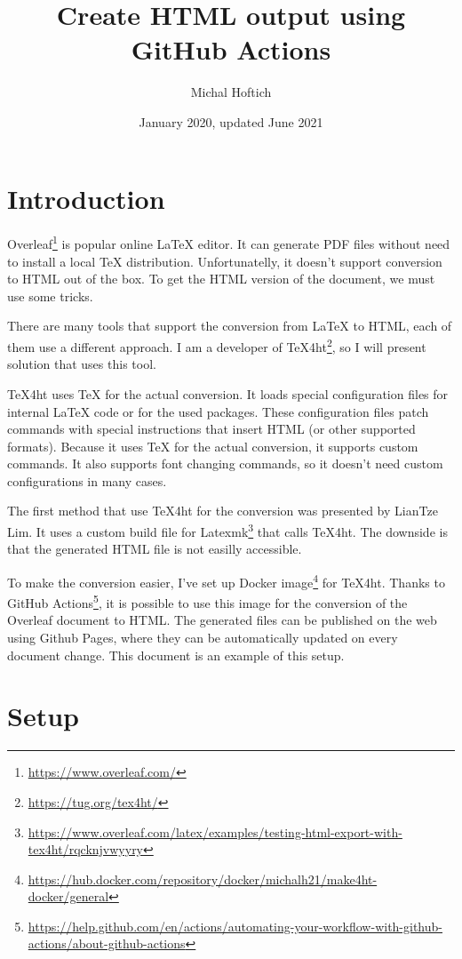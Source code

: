 \documentclass{article}
\title{Create HTML output using GitHub Actions}
\author{Michal Hoftich}
\date{January 2020, updated June 2021}
\newcommand\footurl[1]{\footnote{\url{#1}}}
\newcommand\urllink[2]{#1\footurl{#2}}
\begin{document}
\maketitle


\section{Introduction}

\urllink{Overleaf}{https://www.overleaf.com/} is popular online \LaTeX{}
editor. It can generate PDF files 
without need to install a local \TeX{} distribution. Unfortunatelly, it doesn't
support conversion to HTML out of the box. To get the HTML version of the
document, we must use some tricks.

There are many tools that support the conversion from \LaTeX{} to HTML, each of
them use a different approach. I am a developer of
\urllink{\TeX4ht}{https://tug.org/tex4ht/}, so I will present solution that
uses this tool. 

\TeX4ht uses \TeX{} for the actual conversion. It loads special configuration
files for internal \LaTeX{} code or for the used packages. These configuration
files patch commands with special instructions that insert HTML (or other
supported formats). Because it uses \TeX{} for the actual conversion, it
supports custom commands. It also supports font changing commands, so  it
doesn't need custom configurations in many cases.

The first method that use \TeX4ht for the conversion was presented by LianTze
Lim. It uses a custom build file for
\urllink{Latexmk}{https://www.overleaf.com/latex/examples/testing-html-export-with-tex4ht/rqcknjvwyyry} 
that calls \TeX4ht. The downside is that the generated HTML file is not easilly accessible.  

To make the conversion easier, I've set up \urllink{Docker image}{https://hub.docker.com/repository/docker/michalh21/make4ht-docker/general} for \TeX4ht. 
Thanks to \urllink{GitHub Actions}{https://help.github.com/en/actions/automating-your-workflow-with-github-actions/about-github-actions}, 
it is possible to use this image for the conversion of the Overleaf document to HTML. 
The generated files can be published on the web using Github Pages, where they can be automatically 
updated on every document change. This document is an example of this setup.

\section{Setup}
\end{document}
